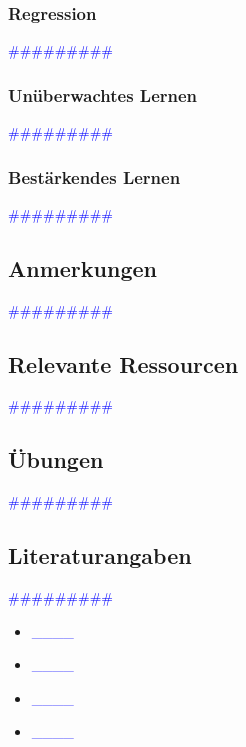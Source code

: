 \documentclass{article}
\begin{document}
    \subsubsection{Regression} %
      \textcolor{blue}{\#\#\#\#\#\#\#\#\#}
    \subsubsection{Unüberwachtes Lernen} %
      \textcolor{blue}{\#\#\#\#\#\#\#\#\#}
    \subsubsection{Bestärkendes Lernen} %
      \textcolor{blue}{\#\#\#\#\#\#\#\#\#}
  \subsection{Anmerkungen} %
      \textcolor{blue}{\#\#\#\#\#\#\#\#\#}
  \subsection{Relevante Ressourcen} %
      \textcolor{blue}{\#\#\#\#\#\#\#\#\#}
  \subsection{Übungen} %
      \textcolor{blue}{\#\#\#\#\#\#\#\#\#}
  \subsection{Literaturangaben} %
      \textcolor{blue}{\#\#\#\#\#\#\#\#\#}

      \begin{itemize}
      \color{red}
        \item  \textcolor{blue}{\_\_\_\_} 
        \item  \textcolor{blue}{\_\_\_\_}
      \color{ForestGreen}
        \item  \textcolor{blue}{\_\_\_\_} 
        \item  \textcolor{blue}{\_\_\_\_}
      \end{itemize}
\end{document}
